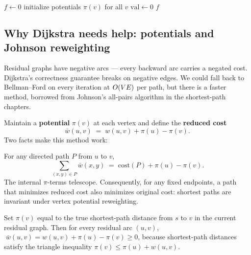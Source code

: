 \begin{algorithm}[H]
\caption{Successive Shortest Paths (with potentials)}
\label{ch14:alg-ssp}
$f \gets 0$\;
initialize potentials $\pi(v)$ for all $v$ 
$\mathrm{val}\gets 0$\;
\Return $f$\;
\end{algorithm}

\subsection{Why Dijkstra needs help: potentials and Johnson reweighting}

Residual graphs have negative arcs --- every backward arc carries a negated cost. Dijkstra's correctness guarantee breaks on negative edges. We could fall back to Bellman--Ford on every iteration at $O(VE)$ per path, but there is a faster method, borrowed from Johnson's all-pairs algorithm in the shortest-path chapters.

Maintain a \textbf{potential} $\pi(v)$ at each vertex and define the \textbf{reduced cost}
\[
  \bar w(u,v) \;=\; w(u,v) + \pi(u) - \pi(v).
\]
Two facts make this method work:

\begin{lemma}\label{ch14:lem-reduced}
For any directed path $P$ from $u$ to $v$,
\[
  \sum_{(x,y)\in P}\bar w(x,y) \;=\; \mathrm{cost}(P) + \pi(u) - \pi(v).
\]
The internal $\pi$-terms telescope. Consequently, for any fixed endpoints, a path that minimizes reduced cost also minimizes original cost: shortest paths are invariant under vertex potential reweighting.
\end{lemma}

\begin{lemma}\label{ch14:lem-nonneg}
Set $\pi(v)$ equal to the true shortest-path distance from $s$ to $v$ in the current residual graph. Then for every residual arc $(u,v)$, $\;\bar w(u,v)=w(u,v)+\pi(u)-\pi(v)\ge 0$, because shortest-path distances satisfy the triangle inequality $\pi(v)\le \pi(u)+w(u,v)$.
\end{lemma}

